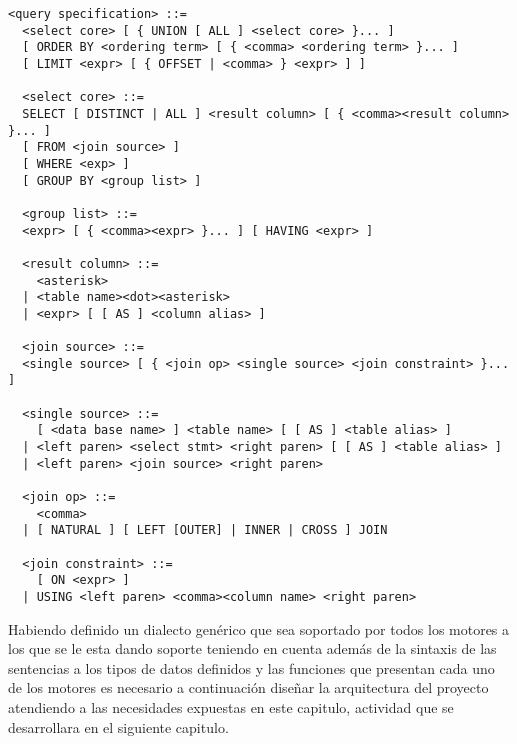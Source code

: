 \begin{Verbatim}[frame=single, label=sintaxis para SELECT]
  <query specification> ::=
  <select core> [ { UNION [ ALL ] <select core> }... ]
  [ ORDER BY <ordering term> [ { <comma> <ordering term> }... ]
  [ LIMIT <expr> [ { OFFSET | <comma> } <expr> ] ]
  
  <select core> ::=
  SELECT [ DISTINCT | ALL ] <result column> [ { <comma><result column> }... ] 
  [ FROM <join source> ]
  [ WHERE <exp> ]
  [ GROUP BY <group list> ]
  
  <group list> ::=
  <expr> [ { <comma><expr> }... ] [ HAVING <expr> ]
  
  <result column> ::=
    <asterisk>
  | <table name><dot><asterisk>
  | <expr> [ [ AS ] <column alias> ]
  
  <join source> ::=
  <single source> [ { <join op> <single source> <join constraint> }... ]
  
  <single source> ::=
    [ <data base name> ] <table name> [ [ AS ] <table alias> ]
  | <left paren> <select stmt> <right paren> [ [ AS ] <table alias> ]
  | <left paren> <join source> <right paren>

  <join op> ::=
    <comma>
  | [ NATURAL ] [ LEFT [OUTER] | INNER | CROSS ] JOIN
  
  <join constraint> ::=
    [ ON <expr> ]
  | USING <left paren> <comma><column name> <right paren>
\end{Verbatim}

Habiendo definido un dialecto genérico que sea soportado por todos los motores a los que se le esta dando soporte teniendo en cuenta además de la sintaxis de las sentencias a los tipos de datos definidos y las funciones que presentan cada uno de los motores es necesario a continuación diseñar la arquitectura del proyecto atendiendo a las necesidades expuestas en este capitulo, actividad que se desarrollara en el siguiente capitulo. 